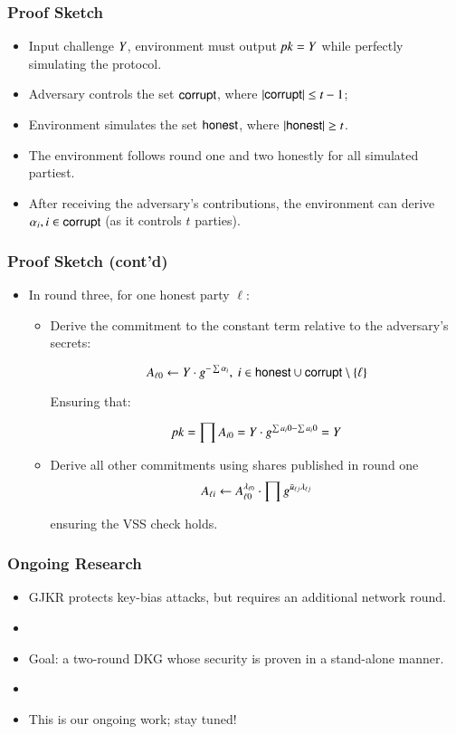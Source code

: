 \documentclass[hyperref={pdfpagelabels=true},table,dvipsnames,14pt,aspectratio=169]{beamer}
\begin{document}
\begin{frame}
  \frametitle{Proof Sketch}

  \begin{itemize}
    \item Input challenge $Y$, environment must output $\mathit{pk} = Y$ while perfectly simulating the protocol.
    \item<2-> Adversary controls the set $\mathsf{corrupt}$, where $\lvert \mathsf{corrupt} \rvert \leq t-1$;
    \item<3-> Environment simulates the set $\mathsf{honest}$, where $\lvert \mathsf{honest} \rvert \geq t$.
    \item<4-> The environment follows round one and two honestly for all simulated partiest.
    \item<5-> After receiving the adversary's contributions, the environment can derive $\alpha_i, i \in \mathsf{corrupt}$ (as it controls $t$ parties).
  \end{itemize}
\end{frame}


\begin{frame}
  \frametitle{Proof Sketch (cont'd)}

  \begin{itemize}
    \item In round three, for one honest party $\ell$:
  \begin{itemize}
    \item<2-> Derive the commitment to the constant term relative to the adversary's secrets:

      \[ A_{\ell 0} \gets Y \cdot g^{- \sum \alpha_i},\ i \in \mathsf{honest} \cup \mathsf{corrupt} \setminus \{ \ell\}  \]

      Ensuring that:

      \[ \mathit{pk} = \prod A_{i0} = Y \cdot g^{\sum a_i0 - \sum a_i0}  = Y  \]

    \item<3-> Derive all other commitments using shares published in round one
      \[ A_{\ell i} \gets  A_{\ell 0}^{\lambda_{\ell 0}} \cdot \prod g^{\bar{u}_{\ell j}\lambda_{\ell j }}   \]

      ensuring the VSS check holds.

  \end{itemize}
  \end{itemize}
\end{frame}

\begin{frame}
  \frametitle{Ongoing Research}

  \begin{itemize}
    \item GJKR protects key-bias attacks, but requires an additional network round.
    \item[]
    \item<2-> Goal: a two-round DKG whose security is proven in a stand-alone manner.
    \item[]
    \item<3-> This is our ongoing work; stay tuned!
  \end{itemize}
\end{frame}
\end{document}
